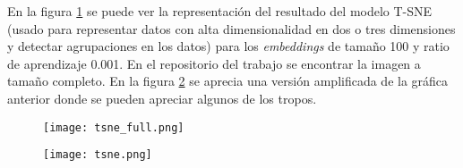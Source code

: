 \begin{center}
  \begin{table}
  \caption{Tropos similares usando \textit{embeddings} de tamaño 75}
  \label{w75}
  \end{table}
\end{center}


\begin{center}
\begin{table}
  \caption{Tropos similares usando \textit{embeddings} de tamaño 100}
  \label{w100}
\end{table}
\end{center}

En la figura \ref{tsne_full} se puede ver la representación del resultado del modelo T-SNE (usado para representar datos con alta dimensionalidad en dos o tres dimensiones y detectar agrupaciones en los datos)
para los \textit{embeddings} de tamaño 100 y ratio de aprendizaje 0.001.
En el repositorio del trabajo se encontrar la imagen a tamaño completo. En la figura \ref{tsne} se aprecia una versión amplificada de la gráfica anterior donde
se pueden apreciar algunos de los tropos.

\begin{figure}\label{tsne_full}
  \texttt{[image: tsne\_full.png]}
  \centering
\end{figure}

\begin{figure}\label{tsne}
  \texttt{[image: tsne.png]}
  \centering
\end{figure}

